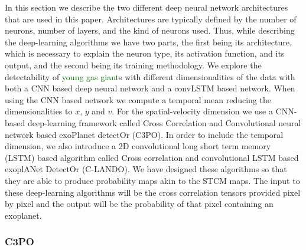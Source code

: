 \documentclass{aa}
\newcommand{\newchange}[1]{\textcolor{darkgreen}{#1}}
\begin{document}
In this section we describe the two different deep neural network architectures that are used in this paper.
Architectures are typically defined by the number of neurons, number of layers, and the kind of neurons used.
Thus, while describing the deep-learning algorithms we have two parts, the first being its architecture, which is necessary to explain the neuron type, its activation function, and its output, and the second being its training methodology.
We explore the detectability of \newchange{young gas giant}s with different dimensionalities of the data with both a CNN based deep neural network and a convLSTM based network.
When using the CNN based network we compute a temporal mean reducing the dimensionalities to $x$, $y$ and $v$.
For the spatial-velocity dimension we use a CNN-based deep-learning framework called Cross Correlation and Convolutional neural network based exoPlanet detectOr (C3PO).
In order to include the temporal dimension, we also introduce a 2D convolutional long short term memory (LSTM) based algorithm called Cross correlation and convolutional LSTM based exoplANet DetectOr (C-LANDO).
We have designed these algorithms so that they are able to produce probability maps akin to the STCM maps. 
The input to these deep-learning algorithms will be the cross correlation tensors provided pixel by pixel and the output will be the probability of that pixel containing an exoplanet. %

\subsubsection{C3PO}
\end{document}
